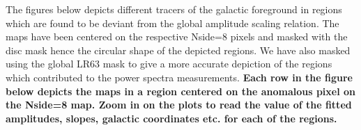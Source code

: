 \documentclass[12pt]{article}
\begin{document}
The figures below depicts different tracers of the galactic foreground in regions which are found to be deviant from the global amplitude scaling relation. The maps have been centered on the respective Nside=8 pixels and masked with the disc mask hence the circular shape of the depicted regions. We have also masked using the global LR63 mask to give a more accurate depiction of the regions which contributed to the power spectra measurements. {\bf Each row in the figure below depicts the maps in a region centered on the anomalous pixel on the Nside=8 map. Zoom in on the plots to read the value of the fitted amplitudes, slopes, galactic coordinates etc. for each of the regions.}
\begin{figure}[!h]
 \hspace{-0.2cm}
 \hspace{-0.2cm}
 \hspace{-0.2cm}
 \hspace{-0.2cm}
 \hspace{-0.2cm}
 \hspace{-0.2cm}

\end{figure}
\end{document}
